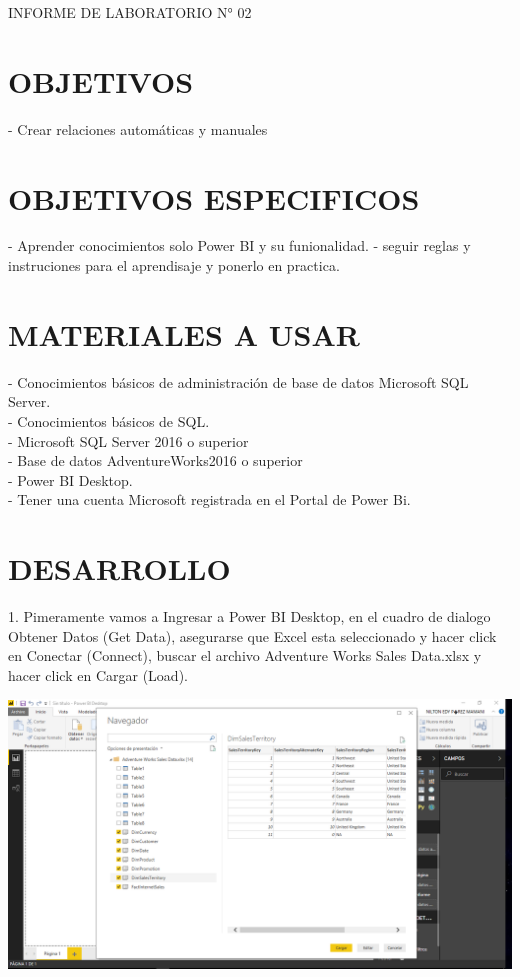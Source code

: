 \begin{center}
    INFORME DE LABORATORIO N° 02
\end{center}

\section{OBJETIVOS}
- Crear relaciones automáticas y manuales

\section{OBJETIVOS ESPECIFICOS}
- Aprender conocimientos solo Power BI y su funionalidad.
- seguir reglas y instruciones para el aprendisaje y ponerlo en practica.

\section{MATERIALES A USAR}

\begin{itemize}

- Conocimientos básicos de administración de base de datos Microsoft   SQL Server.
\\- Conocimientos básicos de SQL.
\\- Microsoft SQL Server 2016 o superior
\\- Base de datos AdventureWorks2016 o superior
\\- Power BI Desktop.
\\- Tener una cuenta Microsoft registrada en el Portal de Power Bi.
\end{itemize}

\section{DESARROLLO} 

\begin{itemize}
1. Pimeramente vamos a Ingresar a Power BI Desktop, en el cuadro de dialogo Obtener Datos (Get Data), asegurarse que Excel esta seleccionado y hacer click en Conectar (Connect), buscar el archivo Adventure Works Sales Data.xlsx y hacer click en Cargar (Load).

\end{itemize} 

\begin{center}
\includegraphics[width=15cm]{./Imagenes/Imagen1} 
\end{center}

